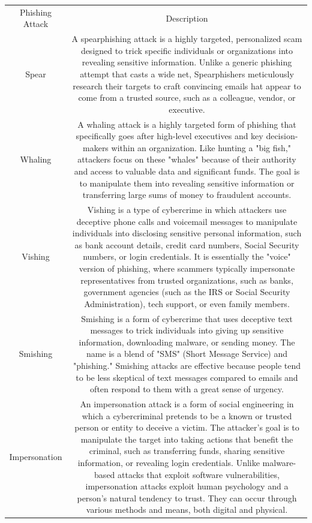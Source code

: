 {\begin{table}
    \centering
    \begin{tabular}{cc}
         Phishing Attack& Description\\
         Spear& A spearphishing attack is a highly targeted, personalized scam designed to trick specific individuals or organizations into revealing sensitive information. Unlike a generic phishing attempt that casts a wide net, Spearphishers meticulously research their targets to craft convincing emails hat appear to come from a trusted source, such as a colleague, vendor, or executive.\\
         Whaling& A whaling attack is a highly targeted form of phishing that specifically goes after high-level executives and key decision-makers within an organization. Like hunting a "big fish," attackers focus on these "whales" because of their authority and access to valuable data and significant funds. The goal is to manipulate them into revealing sensitive information or transferring large sums of money to fraudulent accounts.\\
         Vishing& Vishing is a type of cybercrime in which attackers use deceptive phone calls and voicemail messages to manipulate individuals into disclosing sensitive personal information, such as bank account details, credit card numbers, Social Security numbers, or login credentials. It is essentially the "voice" version of phishing, where scammers typically impersonate representatives from trusted organizations, such as banks, government agencies (such as the IRS or Social Security Administration), tech support, or even family members.\\
         Smishing& Smishing is a form of cybercrime that uses deceptive text messages to trick individuals into giving up sensitive information, downloading malware, or sending money. The name is a blend of "SMS" (Short Message Service) and "phishing." Smishing attacks are effective because people tend to be less skeptical of text messages compared to emails and often respond to them with a great sense of urgency.\\
         Impersonation& An impersonation attack is a form of social engineering in which a cybercriminal pretends to be a known or trusted person or entity to deceive a victim. The attacker's goal is to manipulate the target into taking actions that benefit the criminal, such as transferring funds, sharing sensitive information, or revealing login credentials. Unlike malware-based attacks that exploit software vulnerabilities, impersonation attacks exploit human psychology and a person's natural tendency to trust. They can occur through various methods and means, both digital and physical.\\

\end{tabular}
\end{table}}

